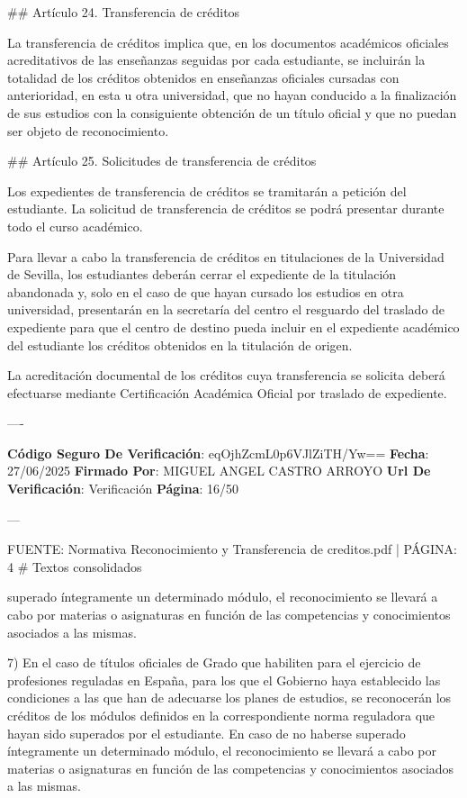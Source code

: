 \documentclass{article}
\begin{document}
\begin{itemize}
\begin{itemize}
\begin{scriptsize}
                  \#\# Artículo 24. Transferencia de créditos

                  La transferencia de créditos implica que, en los documentos académicos oficiales acreditativos de las enseñanzas seguidas por cada estudiante, se incluirán la totalidad de los créditos obtenidos en enseñanzas oficiales cursadas con anterioridad, en esta u otra universidad, que no hayan conducido a la finalización de sus estudios con la consiguiente obtención de un título oficial y que no puedan ser objeto de reconocimiento.

                  \#\# Artículo 25. Solicitudes de transferencia de créditos

                  Los expedientes de transferencia de créditos se tramitarán a petición del estudiante. La solicitud de transferencia de créditos se podrá presentar durante todo el curso académico.

                  Para llevar a cabo la transferencia de créditos en titulaciones de la Universidad de Sevilla, los estudiantes deberán cerrar el expediente de la titulación abandonada y, solo en el caso de que hayan cursado los estudios en otra universidad, presentarán en la secretaría del centro el resguardo del traslado de expediente para que el centro de destino pueda incluir en el expediente académico del estudiante los créditos obtenidos en la titulación de origen.

                  La acreditación documental de los créditos cuya transferencia se solicita deberá efectuarse mediante Certificación Académica Oficial por traslado de expediente.

                  ----

                  \textbf{Código Seguro De Verificación}: eqOjhZcmL0p6VJlZiTH/Yw==
                  \textbf{Fecha}: 27/06/2025
                  \textbf{Firmado Por}: MIGUEL ANGEL CASTRO ARROYO
                  \textbf{Url De Verificación}: Verificación
                  \textbf{Página}: 16/50

                  ---

                  FUENTE: Normativa Reconocimiento y Transferencia de creditos.pdf | PÁGINA: 4
                  \# Textos consolidados

                  superado íntegramente un determinado módulo, el reconocimiento se llevará a cabo por materias o asignaturas en función de las competencias y conocimientos asociados a las mismas.

                  7) En el caso de títulos oficiales de Grado que habiliten para el ejercicio de profesiones reguladas en España, para los que el Gobierno haya establecido las condiciones a las que han de adecuarse los planes de estudios, se reconocerán los créditos de los módulos definidos en la correspondiente norma reguladora que hayan sido superados por el estudiante. En caso de no haberse superado íntegramente un determinado módulo, el reconocimiento se llevará a cabo por materias o asignaturas en función de las competencias y conocimientos asociados a las mismas.


\end{scriptsize}
\end{itemize}
\end{itemize}
\end{document}

